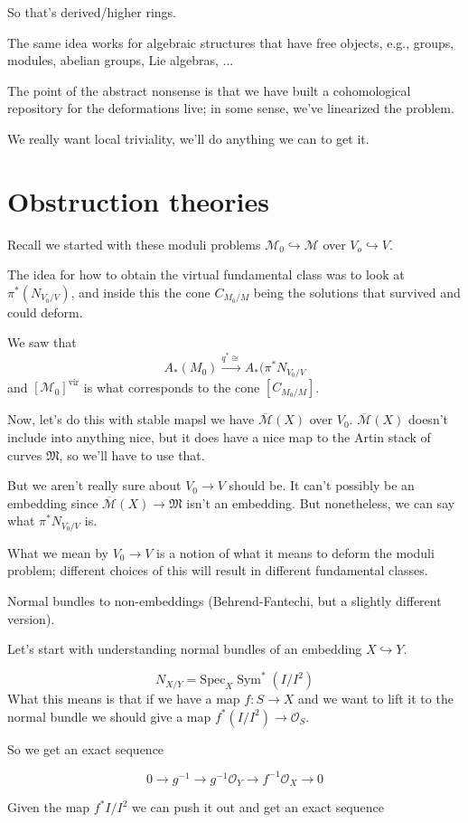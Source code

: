 \documentclass{amsart}
\theoremstyle{definition}
\DeclareMathOperator{\Sym}{Sym}
\newcommand{\into}{\hookrightarrow}
\newcommand{\Spec}{\text{Spec}}
\newcommand{\OO}{\mathcal{O}}
\newcommand{\Mbar}{\overline{\mathcal{M}}}
\newcommand{\M}{\mathcal{M}}
\newcommand{\vir}{\text{vir}}
\begin{document}
So that's derived/higher rings.

The same idea works for algebraic structures that have free objects, e.g., groups, modules, abelian groups, Lie algebras, ...


The point of the abstract nonsense is that we have built a cohomological repository for the deformations live; in some sense, we've linearized the problem.  

We really want local triviality, we'll do anything we can to get it.

\section{Obstruction theories}
Recall we started with these moduli problems
$\M_0\into \M$ over $V_o\into V$.

The idea for how to obtain the virtual fundamental class was to look at $\pi^*(N_{V_0/V})$, and inside this the cone $C_{M_0/M}$ being the solutions that survived and could deform.

We saw that $$A_*(M_0)\stackrel{q^*\cong}\to A_*(\pi^* N_{V_0/V}$$
and $[\M_0]^\vir$ is what corresponds to the cone $[C_{M_0/M}]$.

Now, let's do this with stable mapsl we have $\Mbar(X)$ over $V_0$.  $\Mbar(X)$ doesn't include into anything nice, but it does have a nice map to the Artin stack of curves $\mathfrak{M}$, so we'll have to use that.

But we aren't really sure about $V_0\to V$ should be.  It can't possibly be an embedding since $\Mbar(X)\to\mathfrak{M}$ isn't an embedding.  But nonetheless, we can say what $\pi^* N_{V_0/V}$ is.


What we mean by $V_0\to V$ is a notion of what it means to deform the moduli problem; different choices of this will result in different fundamental classes.


Normal bundles to non-embeddings (Behrend-Fantechi, but a slightly different version).

Let's start with understanding normal bundles of an embedding $X\into Y$.

$$N_{X/Y}=\Spec_X\Sym^*(I/I^2)$$
What this means is that if we have a map $f:S\to X$ and we want to lift it to the normal bundle we should give a map $f^*(I/I^2)\to \OO_S$.

So we get an exact sequence

$$0\to g^{-1} \to g^{-1}\OO_Y\to f^{-1} \OO_X\to 0$$

Given the map $f^*I/I^2$ we can push it out and get an exact sequence
\end{document}
